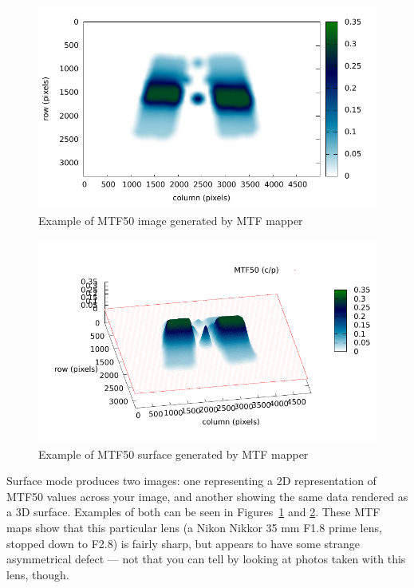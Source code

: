 \documentclass[a4paper]{article}
\begin{document}
\begin{figure}[hp!]
\centering
\includegraphics{figures/sample_grid_image}
\caption{Example of MTF50 image generated by MTF mapper}
\label{fig:sample_grid_image}
\end{figure}

\begin{figure}[hp!]
\centering
\includegraphics{figures/sample_grid_surface}
\caption{Example of MTF50 surface generated by MTF mapper}
\label{fig:sample_grid_surface}
\end{figure}

Surface mode produces two images: one representing a 2D
representation of MTF50 values across your image, and another showing the
same data rendered as a 3D surface. Examples of both can be seen in
Figures~\ref{fig:sample_grid_image} and \ref{fig:sample_grid_surface}. These
MTF maps show that this particular lens (a Nikon Nikkor 35 mm F1.8 prime
lens, stopped down to F2.8) is fairly sharp, but appears to have some
strange asymmetrical defect --- not that you can tell by looking at photos
taken with this lens, though.
\end{document}
